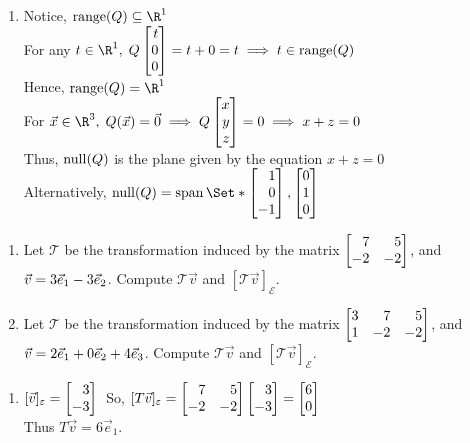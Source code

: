 \begin{exercises}
\begin{problist}
\begin{solution}
\begin{enumerate}
    		    \item Notice, $\Range(Q)\subseteq \R^1$\\
    		    For any $t\in\R^1, \; Q\mat{t\\0\\0}=t+0=t \implies t \in \Range(Q)$\\
    		    Hence, $\Range(Q) = \R^1$\\
    		    For $\vec x \in \R^3, \; Q(\vec x) = \vec 0 \implies Q\mat{x\\y\\z}=0 \implies x+z=0$\\
    		    Thus, $\operatorname{null}(Q)$ is the plane given by the equation $x+z=0$\\
    		    Alternatively, $\Null(Q) = \Span\Set*{\mat{1\\0\\-1},\mat{0\\1\\0}}$
		    
		    \end{enumerate}
		\end{solution}

		\prob 
		\begin{enumerate}
			\item Let $\mathcal T$ be the transformation induced by the
				matrix $\mat{7&5\\-2&-2}$, and
				$\vec v=3{\vec e_1}-3{\vec e_2}$.
				Compute $\mathcal T\vec v$ and $[\mathcal T\vec v]_{\mathcal E}$.

			\item Let $\mathcal T$ be the transformation induced by the
				matrix $\mat{3&7&5\\1&-2&-2}$, and
				$\vec v=2{\vec e_1}+0{\vec e_2}+4{\vec e_3}$.
				Compute $\mathcal T\vec v$ and $[\mathcal T\vec v]_{\mathcal E}$.
		\end{enumerate}

		\begin{solution}
		    \begin{enumerate}
    		    \item $[\vec v]_\varepsilon = \mat{3\\-3}\;$ So, $[T\vec v]_\varepsilon = \mat{7&5\\-2&-2}\mat{3\\-3}=\mat{6\\0}$\\
    		
    	    	Thus $T\vec v =6\vec e_1.$
    	    	

\end{enumerate}
\end{solution}
\end{problist}
\end{exercises}
